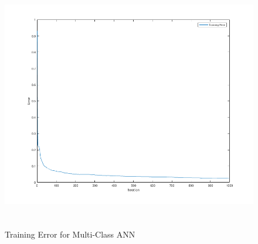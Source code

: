\documentclass[12pt]{article}
\begin{document}
\begin{figure}[H]
\begin{center}
\includegraphics[height=11cm]{problem3_training_error.png}
\caption{Training Error for Multi-Class ANN}
\end{center}
\end{figure}
\end{document}
